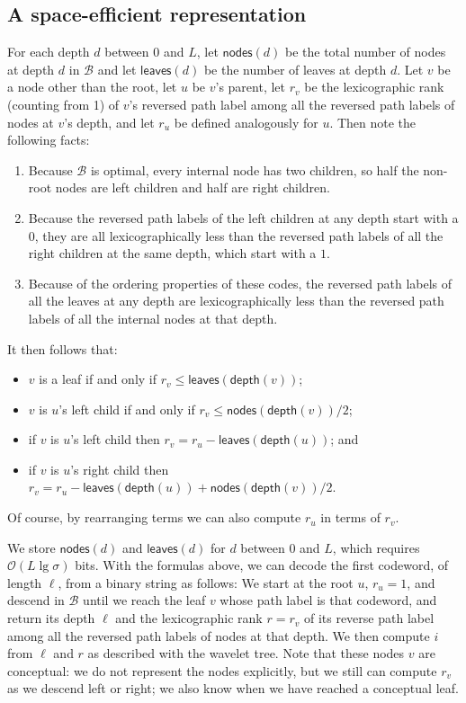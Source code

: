\documentclass[preprint,12pt]{elsarticle}
\newcommand{\Oh}[1]{\ensuremath{\mathcal{O}\!\left({#1}\right)}}
\newcommand{\depth}{\ensuremath{\mathsf{depth}}}
\newcommand{\nodes}{\ensuremath{\mathsf{nodes}}}
\newcommand{\leaves}{\ensuremath{\mathsf{leaves}}}
\newcommand{\B}{\mathcal{B}}
\renewcommand{\log}{\lg}
\begin{document}
\subsection{A space-efficient representation}

For each depth $d$ between 0 and $L$, let \(\nodes (d)\) be the total number of nodes at depth $d$ in $\B$ and let \(\leaves (d)\) be the number of leaves at depth $d$.  Let $v$ be a node other than the root, let $u$ be $v$'s parent, let $r_v$ be the lexicographic rank (counting from 1) of $v$'s reversed path label among all the reversed path labels of nodes at $v$'s depth, and let $r_u$ be defined analogously for $u$. Then note the following facts:
\begin{enumerate}
\item Because $\B$ is optimal, every internal node has two children, so half the non-root nodes are left children and half are right children.  
\item Because the reversed path labels of the left children at any depth 
start with a $0$, they are all lexicographically less than the reversed path 
labels of all the right children at the same depth, which start with a $1$.  
\item Because of the ordering properties of these codes, the reversed path labels of all the leaves at any depth are lexicographically less than the reversed path labels of all the internal nodes at that depth.
\end{enumerate}

It then follows that:
\begin{itemize}
\item $v$ is a leaf if and only if $r_v \le \leaves(\depth(v))$;
\item $v$ is $u$'s left child if and only if \(r_v \leq \nodes (\depth (v)) / 2\);
\item if $v$ is $u$'s left child then \(r_v = r_u - \leaves (\depth (u))\); and
\item if $v$ is $u$'s right child then \(r_v = r_u - \leaves (\depth (u)) + \nodes (\depth (v)) / 2\).
\end{itemize}
Of course, by rearranging terms we can also compute $r_u$ in terms of $r_v$.

We store \(\nodes (d)\) and \(\leaves (d)\) for $d$ between 0 and $L$, which 
requires $\Oh{L\log\sigma}$ bits. With the formulas above, we can decode the
first codeword, of length $\ell$, from a binary string as follows:
We start at the root $u$, $r_u=1$, and descend in $\B$ until we reach the leaf 
$v$ whose path
label is that codeword, and return its depth $\ell$ and the lexicographic rank 
$r=r_v$ of its reverse path label among all the reversed path labels of nodes 
at that depth. We then compute $i$ from $\ell$ and $r$ as described with the
wavelet tree. Note that these nodes $v$ are
conceptual: we do not represent the nodes explicitly, but we still can compute
$r_v$ as we descend left or right; we also know when we have reached a 
conceptual leaf. 
\end{document}
